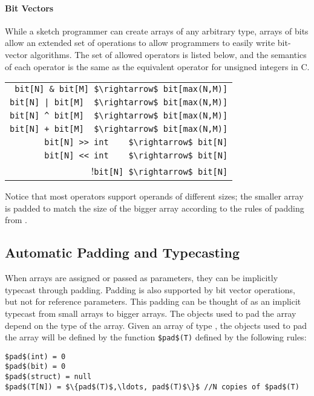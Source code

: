 \paragraph{Bit Vectors}
While a sketch programmer can create arrays of any arbitrary type, arrays of bits allow an extended set of operations to allow programmers to easily write bit-vector algorithms. The set of allowed operators is listed below, and the semantics of each operator is the same as the equivalent operator for unsigned integers in C.
\begin{center}
\begin{tabular}{r}
\lstinline!bit[N] & bit[M] $\rightarrow$ bit[max(N,M)]!\\
\lstinline!bit[N] | bit[M]  $\rightarrow$ bit[max(N,M)]!\\
\lstinline!bit[N] ^ bit[M]  $\rightarrow$ bit[max(N,M)]!\\
\lstinline!bit[N] + bit[M]  $\rightarrow$ bit[max(N,M)]!\\
\lstinline!bit[N] >> int    $\rightarrow$ bit[N]!\\
\lstinline!bit[N] << int    $\rightarrow$ bit[N]!\\
!\lstinline!bit[N] $\rightarrow$ bit[N]!\\
\end{tabular}
\end{center}

Notice that most operators support operands of different sizes; the smaller array is padded to match the size of the bigger array according to the rules of padding from .




\subsection{Automatic Padding and Typecasting}
When arrays are assigned or passed as parameters, they can be implicitly typecast through padding. Padding is also supported by bit vector operations, but not for reference parameters. This padding can be thought of as an implicit typecast from small arrays to bigger arrays. The objects used to pad the array depend on the type of the array. Given an array of type , the objects used to pad the array will be defined by the function \lstinline!$pad$(T)! defined by the following rules:
\begin{lstlisting}
$pad$(int) = 0
$pad$(bit) = 0
$pad$(struct) = null
$pad$(T[N]) = $\{pad$(T)$,\ldots, pad$(T)$\}$ //N copies of $pad$(T)
\end{lstlisting}

